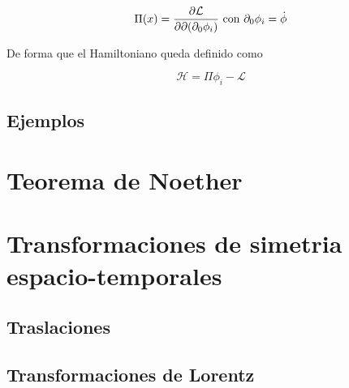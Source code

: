 \[\Pi(x)=\pdv{\mathcal{L}}{\partial(\partial_{0}\phi_{i})}\text{ con }\partial_{0}\phi_{i}= \dot{\phi}\]

De forma que el Hamiltoniano queda definido como 

\[\mathcal{H}=\Pi\phi_{i}-\mathcal{L}\]

\subsection{Ejemplos}

\begin{example}
  
\end{example}
\begin{example}
  
\end{example}
\begin{example}
  
\end{example}
\begin{example}
  
\end{example}
\begin{example}
  
\end{example}
\section{Teorema de Noether}
\section{Transformaciones de simetria espacio-temporales}
\subsection{Traslaciones}
\subsection{Transformaciones de Lorentz}